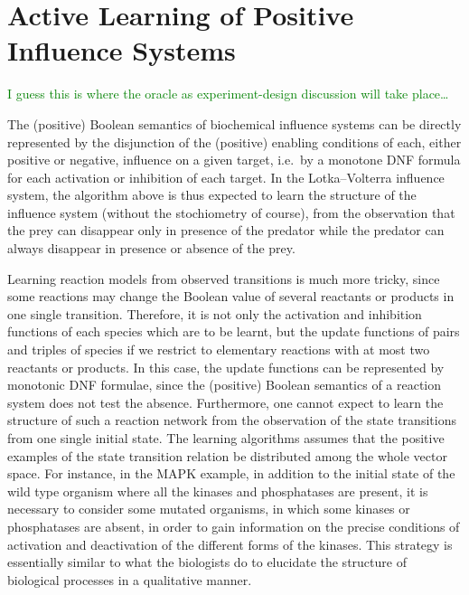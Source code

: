 \documentclass{llncs}
\newcommand{\sylvain}[1]{\textcolor{green}{#1}}
\begin{document}
\section{Active Learning of Positive Influence Systems}
\label{sec:oracles}

\sylvain{I guess this is where the oracle as experiment-design discussion will
take place\dots}

The (positive) Boolean semantics of biochemical influence systems
can be directly represented by the disjunction of the (positive) enabling conditions of each, either positive or negative, influence on a given target,
i.e.~by a monotone DNF formula for each activation or inhibition of each target.
In the Lotka--Volterra influence system, the algorithm above is thus expected to learn the structure of the influence system
(without the stochiometry of course),
from the observation that the prey can disappear only in presence of the predator
while the predator can always disappear in presence or absence of the prey.

  Learning reaction models from observed transitions is much more tricky,
  since some reactions may change the Boolean value of several reactants or products in one single transition.
  Therefore, it is not only the activation and inhibition functions of each species which are to be learnt,
  but the update functions of pairs and triples of species if we restrict to elementary reactions with at most two reactants or products.
  In this case, the update functions can be represented by monotonic DNF formulae, since the (positive) Boolean semantics of a reaction system does not test the absence.
Furthermore,   one cannot expect to learn the structure of such a reaction network
from the observation of the state transitions from one single initial state.
The learning algorithms assumes that the positive examples of the state transition relation be distributed
among the whole vector space.
For instance, in the MAPK example, in addition to the initial state of the wild type organism where all the kinases and phosphatases are present,
it is necessary to consider some mutated organisms, in which some kinases or phosphatases are absent,
in order to gain information on the precise conditions of activation and deactivation of the different forms of the kinases.
This strategy is essentially similar to what the biologists do to elucidate the structure of biological processes
in a qualitative manner.
\end{document}
